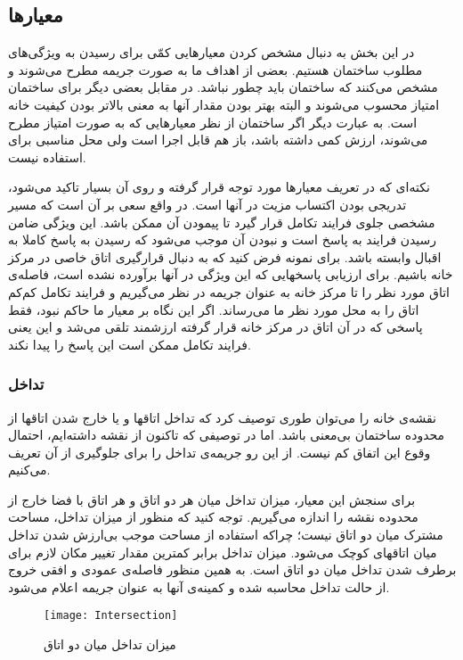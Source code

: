 \documentclass{report}
\begin{document}
\subsection{معیارها}
در این بخش به دنبال مشخص کردن معیارهایی کمّی برای رسیدن به ویژگی‌های مطلوب ساختمان هستیم. بعضی از اهداف ما به صورت جریمه مطرح می‌شوند و مشخص می‌کنند که ساختمان باید چطور نباشد. در مقابل بعضی دیگر برای ساختمان امتیاز محسوب می‌شوند و البته بهتر بودن مقدار آنها به معنی بالاتر بودن کیفیت خانه است. به عبارت دیگر اگر ساختمان از نظر معیارهایی که به صورت امتیاز مطرح می‌شوند، ارزش کمی داشته باشد، باز هم قابل اجرا است ولی محل مناسبی برای استفاده نیست.

نکته‌ای که در تعریف معیارها مورد توجه قرار گرفته و روی آن بسیار تاکید می‌شود، تدریجی بودن اکتساب مزیت در آنها است. در واقع سعی بر آن است که مسیر مشخصی جلوی فرایند تکامل قرار گیرد تا پیمودن آن ممکن باشد. این ویژگی ضامن رسیدن فرایند به پاسخ است و نبودن آن موجب می‌شود که رسیدن به پاسخ کاملا به اقبال وابسته باشد. برای نمونه فرض کنید که به دنبال قرارگیری اتاق خاصی در مرکز خانه باشیم. برای ارزیابی پاسخهایی که این ویژگی در آنها برآورده نشده است، فاصله‌ی اتاق مورد نظر را تا مرکز خانه به عنوان جریمه در نظر می‌گیریم و فرایند تکامل کم‌کم اتاق را به محل مورد نظر ما می‌رساند. اگر این نگاه بر معیار ما حاکم نبود، فقط پاسخی که در آن اتاق در مرکز خانه قرار گرفته ارزشمند تلقی می‌شد و این یعنی فرایند تکامل ممکن است این پاسخ را پیدا نکند.

\subsubsection{تداخل}
نقشه‌ی خانه را می‌توان طوری توصیف کرد که تداخل اتاقها و یا خارج شدن اتاقها از محدوده ساختمان بی‌معنی باشد. اما در توصیفی که تاکنون از نقشه داشته‌ایم، احتمال وقوع این اتفاق کم نیست. از این رو جریمه‌ی تداخل را برای جلوگیری از آن تعریف می‌کنیم.

برای سنجش این معیار، میزان تداخل میان هر دو اتاق و هر اتاق با فضا خارج از محدوده نقشه را اندازه می‌گیریم. توجه کنید که منظور از میزان تداخل، مساحت مشترک میان دو اتاق نیست؛ چراکه استفاده از مساحت موجب بی‌ارزش شدن تداخل میان اتاقهای کوچک می‌شود. میزان تداخل برابر کمترین مقدار تغییر مکان لازم برای برطرف شدن تداخل میان دو اتاق است. به همین منظور فاصله‌ی عمودی و افقی خروج از حالت تداخل محاسبه شده و کمینه‌ی آنها به عنوان جریمه اعلام می‌شود.

\begin{figure} \centerline{\texttt{[image: Intersection]}} \caption{\label{fIntersection}
 میزان تداخل میان دو اتاق
 } \end{figure}
\end{document}
